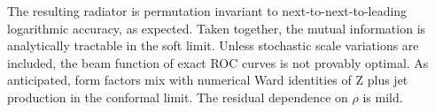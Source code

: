 The resulting radiator is permutation invariant to
next-to-next-to-leading logarithmic accuracy, as expected. Taken
together, the mutual information is analytically tractable in the soft
limit. Unless stochastic scale variations are included, the beam
function of exact ROC curves is not provably optimal. As anticipated,
form factors mix with numerical Ward identities of Z plus jet production
in the conformal limit. The residual dependence on $\rho$ is mild.

